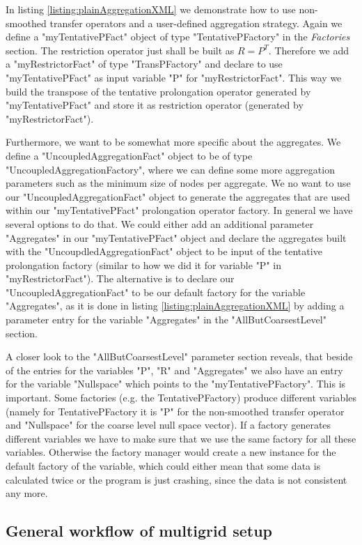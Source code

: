 \documentclass[12pt,a4paper]{article}
\begin{document}
In listing \ref{listing:plainAggregationXML} we demonstrate how to use non-smoothed transfer operators and a user-defined aggregation strategy. Again we define a "myTentativePFact" object of type "TentativePFactory" in the \textit{Factories} section. The restriction operator just shall be built as $R=P^T$. Therefore we add a "myRestrictorFact" of type "TransPFactory" and declare to use "myTentativePFact" as input variable "P" for "myRestrictorFact". This way we build the transpose of the tentative prolongation operator generated by "myTentativePFact" and store it as restriction operator (generated by "myRestrictorFact").

Furthermore, we want to be somewhat more specific about the aggregates. We define a "UncoupledAggregationFact" object to be of type "UncoupledAggregationFactory", where we can define some more aggregation parameters such as the minimum size of nodes per aggregate. We no want to use our "UncoupledAggregationFact" object to generate the aggregates that are used within our "myTentativePFact" prolongation operator factory. In general we have several options to do that. We could either add an additional parameter "Aggregates" in our "myTentativePFact" object and declare the aggregates built with the "UncoupdledAggregationFact" object to be input of the tentative prolongation factory (similar to how we did it for variable "P" in "myRestrictorFact"). The alternative is to declare our "UncoupledAggregationFact" to be our default factory for the variable "Aggregates", as it is done in listing \ref{listing:plainAggregationXML} by adding a parameter entry for the variable "Aggregates" in the "AllButCoarsestLevel" section.

A closer look to the "AllButCoarsestLevel" parameter section reveals, that beside of the entries for the variables "P", "R" and "Aggregates" we also have an entry for the variable "Nullspace" which points to the "myTentativePFactory". This is important. Some factories (e.g. the TentativePFactory) produce different variables (namely for TentativePFactory it is "P" for the non-smoothed transfer operator and "Nullspace" for the coarse level null space vector). If a factory generates different variables we have to make sure that we use the same factory for all these variables. Otherwise the factory manager would create a new instance for the default factory of the variable, which could either mean that some data is calculated twice or the program is just crashing, since the data is not consistent any more.

\subsection{General workflow of multigrid setup}
\end{document}
